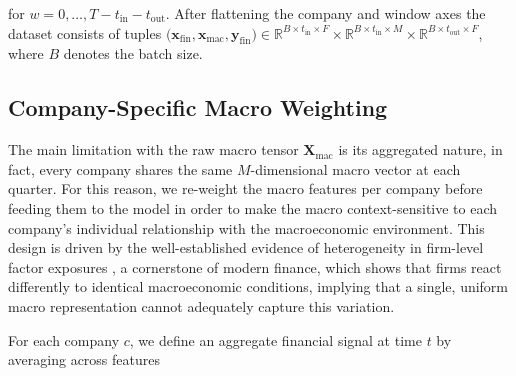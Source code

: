 \documentclass[a4paper,fleqn]{cas-dc}
\newcommand{\nauel}[1]{{\color{orange}{\textbf{Nauel}: #1}}}
\newcommand{\paola}[1]{{\color{blue}{\textbf{Paola}: #1}}}
\begin{document}
for $w = 0, \dots, T - t_{\mathrm{in}} - t_{\mathrm{out}}$.  After flattening the company and window axes
the dataset consists of tuples
$\bigl(\textbf{x}_{\mathrm{fin}}, \textbf{x}_{\mathrm{mac}}, \textbf{y}_{\mathrm{fin}}\bigr) \in
 \mathbb{R}^{B \times t_{\mathrm{in}} \times F} \times
 \mathbb{R}^{B \times t_{\mathrm{in}} \times M} \times
 \mathbb{R}^{B \times t_{\mathrm{out}} \times F}$,
where $B$ denotes the batch size.

\subsection{Company-Specific Macro Weighting}
\label{ssec:macro_weight}
The main limitation with the raw macro tensor $\mathbf{X}_{\mathrm{mac}}$ is its aggregated nature, in fact, every company shares the same $M$-dimensional macro vector at each quarter.  For this reason, we re-weight the macro features per company before feeding them to the model in order to make the macro context-sensitive to each company's individual relationship with the macroeconomic environment. This design is driven by the well-established evidence of heterogeneity in firm-level factor exposures \citep{fama_french_1993}, a cornerstone of modern finance, which shows that firms react differently to identical macroeconomic conditions, implying that a single, uniform macro representation cannot adequately capture this variation.

For each company $c$, we define an aggregate financial signal at time $t$ by averaging across features
\end{document}
